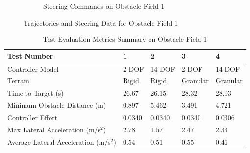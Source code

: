 \documentclass[12pt,twocolumn]{article}
\begin{document}
\begin{figure}
\begin{subfigure}[b]{\columnwidth}
		\caption{\small Steering Commands on Obstacle Field 1}   
		\label{fig:SteeringCommandsField1}
	\end{subfigure}
	\caption{\small Trajectories and Steering Data for Obstacle Field 1}
	\label{fig:Obst1TestData}
\end{figure}

\begin{table}
		\centering
\begin{tabular}{ ||p{5cm}|p{2cm}|p{2cm}|p{2cm}|p{2cm}||  }
		\hline
		Test Number & 1 & 2 & 3 & 4\\
		\hline
		Controller Model & 2-DOF & 14-DOF & 2-DOF & 14-DOF\\
		\hline
		Terrain & Rigid & Rigid & Granular & Granular\\
		\hline
		Time to Target (s)  & 26.67 & 26.15 & 28.32 & 28.03\\ 
		\hline
		Minimum Obstacle Distance (m) & 0.897 & 5.462 & 3.491 & 4.721\\
		\hline
		Controller Effort & 0.0340 & 0.0340 & 0.0340 & 0.0306\\
		\hline
		Max Lateral Acceleration (m/s$^{2}$)& 2.78 & 1.57 & 2.47 & 2.33 \\
		\hline
		Average Lateral Acceleration (m/s$^{2}$) &0.54 & 0.51 & 0.55 & 0.46\\
		\hline
\end{tabular}
\caption{Test Evaluation Metrics Summary on Obstacle Field 1}
\label{t:EvalMetricsObst1}
\end{table}
\end{document}
